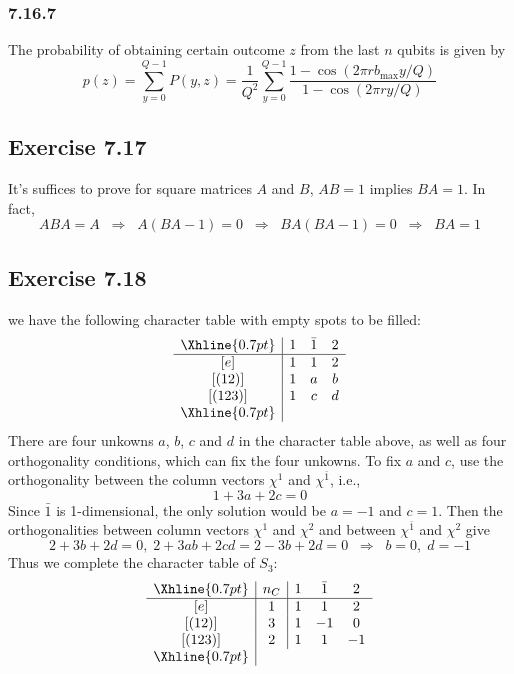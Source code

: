 \documentclass[]{ctexart}
\begin{document}
\subsubsection*{7.16.7}
The probability of obtaining certain outcome $z$ from the last $n$ qubits is given by 
\begin{equation*}
p(z)=\sum_{y=0}^{Q-1}P(y,z)=\frac{1}{Q^2}\sum_{y=0}^{Q-1}\frac{1-\cos(2\pi rb_{\text{max}}y/Q)}{1-\cos(2\pi ry/Q)}
\end{equation*}
\subsection{Exercise 7.17}
It's suffices to prove for square matrices $A$ and $B$, $AB=1$ implies $BA=1$. In fact, 
\begin{equation*}
ABA=A\;\;\Rightarrow\;\;A(BA-1)=0\;\;\Rightarrow\;\;BA(BA-1)=0\;\;\Rightarrow\;\;BA=1
\end{equation*}
\subsection{Exercise 7.18}
we have the following character table with empty spots to be filled: 
\begin{equation*}
\begin{array}{c|ccc}
\Xhline{0.7pt}
& 1 & \bar 1 & 2 \\
\hline
[e] & 1 & 1 & 2 \\
{[(12)]} & 1 & a & b \\
{[(123)]} & 1 & c & d \\
\Xhline{0.7pt}
\end{array}
\end{equation*}
There are four unkowns $a$, $b$, $c$ and $d$ in the character table above, as well as four orthogonality conditions, which can fix the four unkowns. 
To fix $a$ and $c$, use the orthogonality between the column vectors $\chi^1$ and $\chi^{\bar 1}$, i.e., 
\begin{equation*}
1+3a+2c=0
\end{equation*}
Since $\bar 1$ is 1-dimensional, the only solution would be $a=-1$ and $c=1$. Then the orthogonalities between column vectors $\chi^1$ and $\chi^2$ and 
between $\chi^{\bar 1}$ and $\chi^2$ give 
\begin{equation*}
2+3b+2d=0,\;2+3ab+2cd=2-3b+2d=0\;\;\Rightarrow\;\;b=0,\;d=-1
\end{equation*}
Thus we complete the character table of $S_3$: 
\begin{equation*}
\begin{array}{c|c|ccc}
\Xhline{0.7pt}
& n_C & 1 & \bar 1& 2\\
\hline 
[e] & 1 & 1 & 1 & 2\\
{[(12)]} & 3 & 1 & -1 & 0\\
{[(123)]} & 2 & 1 & 1 & -1\\
\Xhline{0.7pt}
\end{array}
\end{equation*}
\end{document}
